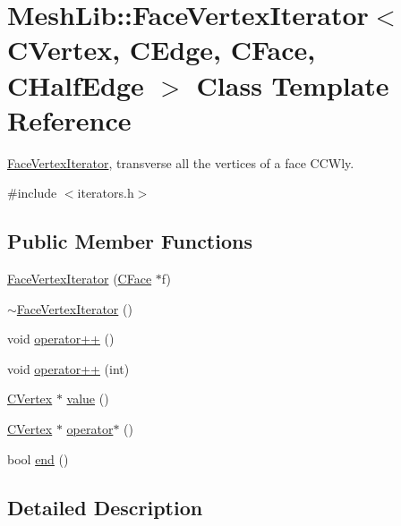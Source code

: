 \hypertarget{class_mesh_lib_1_1_face_vertex_iterator}{}\section{Mesh\+Lib\+:\+:Face\+Vertex\+Iterator$<$ C\+Vertex, C\+Edge, C\+Face, C\+Half\+Edge $>$ Class Template Reference}
\label{class_mesh_lib_1_1_face_vertex_iterator}


\hyperlink{class_mesh_lib_1_1_face_vertex_iterator}{Face\+Vertex\+Iterator}, transverse all the vertices of a face C\+C\+Wly.  




{\ttfamily \#include $<$iterators.\+h$>$}

\subsection*{Public Member Functions}
\begin{DoxyCompactItemize}
\item 
\hyperlink{class_mesh_lib_1_1_face_vertex_iterator_a5bb987960d8c4c1341e498bd271c2a9c}{Face\+Vertex\+Iterator} (\hyperlink{class_mesh_lib_1_1_c_face}{C\+Face} $\ast$f)
\item 
\hyperlink{class_mesh_lib_1_1_face_vertex_iterator_af7f5cb6d47792007453e5b70444b552e}{$\sim$\+Face\+Vertex\+Iterator} ()
\item 
void \hyperlink{class_mesh_lib_1_1_face_vertex_iterator_a48fcbdd253bd64204cd9b287570755da}{operator++} ()
\item 
void \hyperlink{class_mesh_lib_1_1_face_vertex_iterator_a80a8dc853d1c31223437d4ae67cd3b75}{operator++} (int)
\item 
\hyperlink{class_mesh_lib_1_1_c_vertex}{C\+Vertex} $\ast$ \hyperlink{class_mesh_lib_1_1_face_vertex_iterator_a703cf14713514017d9e0e227f9286b1a}{value} ()
\item 
\hyperlink{class_mesh_lib_1_1_c_vertex}{C\+Vertex} $\ast$ \hyperlink{class_mesh_lib_1_1_face_vertex_iterator_a992525a89a87402946b5eac77659cd62}{operator$\ast$} ()
\item 
bool \hyperlink{class_mesh_lib_1_1_face_vertex_iterator_abc127d0fbd0347551998a93b13b73560}{end} ()
\end{DoxyCompactItemize}


\subsection{Detailed Description}
